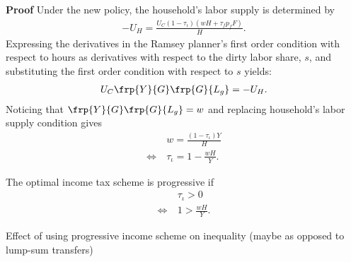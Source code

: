 \textbf{Proof}
Under the new policy, the household's labor supply is determined by
\begin{align}
-U_H=\frac{U_C (1-\tau_{\iota})(wH+\tau_f p_fF)}{H}.
\end{align}
Expressing the derivatives in the Ramsey planner's first order condition with respect to hours as derivatives with respect to the dirty labor share, $s$, and substituting the first order condition with respect to $s$ yields:
\begin{align}
U_C \frp{Y}{G}\frp{G}{L_g}=-U_H.
\end{align}
Noticing that $\frp{Y}{G}\frp{G}{L_g}=w$ and replacing household's labor supply condition gives
\begin{align}
& w=\frac{(1-\tau_\iota)Y}{H}\\
\Leftrightarrow\ & \tau_\iota=1-\frac{wH}{Y}. 
\end{align} 

The optimal income tax scheme is progressive if
\begin{align}
& \tau_{\iota}>0\\
\Leftrightarrow\ & 1>\frac{w H}{Y}.
\end{align}

\begin{prop}
Effect of using progressive income scheme on inequality (maybe as opposed to lump-sum transfers)
\end{prop}

